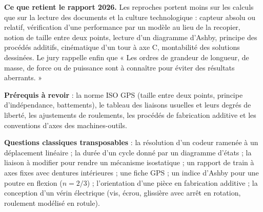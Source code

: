 \documentclass[11pt,a4paper]{article}
\begin{document}
\textbf{Ce que retient le rapport 2026.} Les reproches portent moins sur les calculs que sur la lecture des documents et la culture technologique : capteur absolu ou relatif, vérification d'une performance par un modèle au lieu de la recopier, notion de taille entre deux points, lecture d'un diagramme d'Ashby, principe des procédés additifs, cinématique d'un tour à axe C, montabilité des solutions dessinées. Le jury rappelle enfin que « Les ordres de grandeur de longueur, de masse, de force ou de puissance sont à connaître pour éviter des résultats aberrants. »

\textbf{Prérequis à revoir} : la norme ISO GPS (taille entre deux points, principe d'indépendance, battements), le tableau des liaisons usuelles et leurs degrés de liberté, les ajustements de roulements, les procédés de fabrication additive et les conventions d'axes des machines-outils.

\textbf{Questions classiques transposables} : la résolution d'un codeur ramenée à un déplacement linéaire ; la durée d'un cycle donné par un diagramme d'états ; la liaison à modifier pour rendre un mécanisme isostatique ; un rapport de train à axes fixes avec dentures intérieures ; une fiche GPS ; un indice d'Ashby pour une poutre en flexion (\(n = 2/3\)) ; l'orientation d'une pièce en fabrication additive ; la conception d'un vérin électrique (vis, écrou, glissière avec arrêt en rotation, roulement modélisé en rotule).
\end{document}
